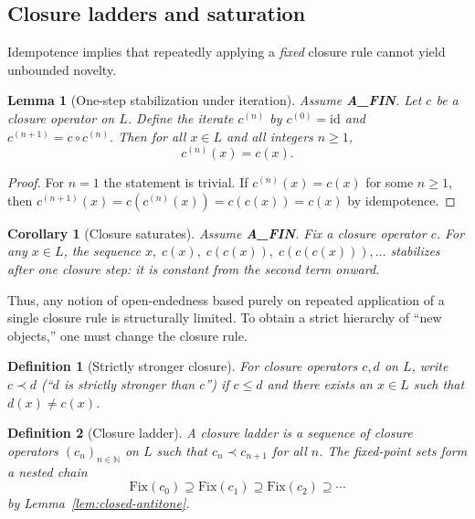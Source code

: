 \documentclass[11pt]{article}
\newtheorem{definition}{Definition}
\newtheorem{lemma}{Lemma}
\newtheorem{corollary}{Corollary}
\theoremstyle{remark}
\begin{document}
\subsection{Closure ladders and saturation}

Idempotence implies that repeatedly applying a \emph{fixed} closure rule cannot yield unbounded novelty.

\begin{lemma}[One-step stabilization under iteration]\label{lem:closure-iterate-stabilizes}
Assume \textbf{A\_FIN}.
Let $c$ be a closure operator on $L$. Define the iterate $c^{(n)}$ by $c^{(0)}=\mathrm{id}$ and
$c^{(n+1)} = c\circ c^{(n)}$. Then for all $x\in L$ and all integers $n\ge 1$,
\[
c^{(n)}(x) = c(x).
\]
\end{lemma}

\begin{proof}
For $n=1$ the statement is trivial. If $c^{(n)}(x)=c(x)$ for some $n\ge 1$, then
$c^{(n+1)}(x)=c(c^{(n)}(x))=c(c(x))=c(x)$ by idempotence.
\end{proof}

\begin{corollary}[Closure saturates]\label{cor:closure-saturates}
Assume \textbf{A\_FIN}.
Fix a closure operator $c$. For any $x\in L$, the sequence
$x,\; c(x),\; c(c(x)),\; c(c(c(x))),\dots$ stabilizes after one closure step:
it is constant from the second term onward.
\end{corollary}

Thus, any notion of open-endedness based purely on repeated application of a single closure rule is
structurally limited. To obtain a strict hierarchy of ``new objects,'' one must change the closure rule.

\begin{definition}[Strictly stronger closure]\label{def:strictly-stronger}
For closure operators $c,d$ on $L$, write $c \prec d$ (``$d$ is strictly stronger than $c$'') if
$c\le d$ and there exists an $x\in L$ such that $d(x)\neq c(x)$.
\end{definition}

\begin{definition}[Closure ladder]\label{def:closure-ladder}
A \emph{closure ladder} is a sequence of closure operators $(c_n)_{n\in\mathbb N}$ on $L$ such that
$c_n \prec c_{n+1}$ for all $n$. The fixed-point sets form a nested chain
\[
\mathrm{Fix}(c_0)\supseteq \mathrm{Fix}(c_1)\supseteq \mathrm{Fix}(c_2)\supseteq \cdots
\]
by Lemma~\ref{lem:closed-antitone}.
\end{definition}
\end{document}
